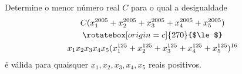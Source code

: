 Determine o menor número real $C$ para o qual a desigualdade
\begin{gather*}
  C (x_1^{2005} +
     x_2^{2005} +
     x_3^{2005} +
     x_4^{2005} +
	 x_5^{2005}) \\ \rotatebox[origin=c]{270}{$\le$} \\
                      x_1x_2x_3x_4x_5
                      (x_1^{125} +
                       x_2^{125} +
                       x_3^{125} +
                       x_4^{125} +
                       x_5^{125})^{16}
\end{gather*}
é válida para quaisquer $x_1, x_2, x_3, x_4, x_5$ reais positivos.
